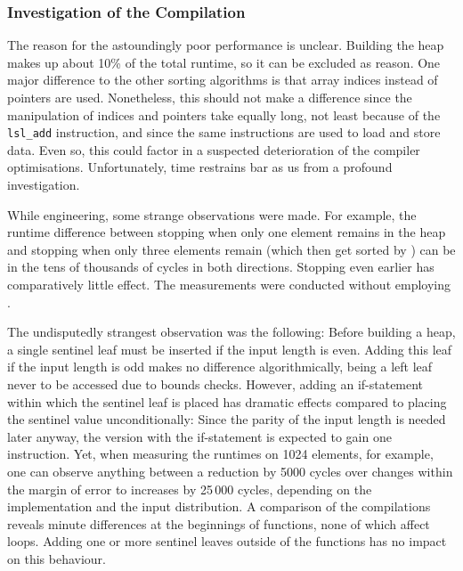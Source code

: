 \subsubsection*{Investigation of the Compilation}
\label{subsubsec:tasklet:heap:compilation}

The reason for the astoundingly poor performance is unclear.
Building the heap makes up about 10\% of the total runtime, so it can be excluded as reason.
One major difference to the other sorting algorithms is that array indices instead of pointers are used.
Nonetheless, this should not make a difference since the manipulation of indices and pointers take equally long, not least because of the \lstinline|lsl_add| instruction, and since the same instructions are used to load and store data.
Even so, this could factor in a suspected deterioration of the compiler optimisations.
Unfortunately, time restrains bar as us from a profound investigation.

While engineering, some strange observations were made.
For example, the runtime difference between stopping \HS{} when only one element remains in the heap and stopping \HS{} when only three elements remain (which then get sorted by \IS{}) can be in the tens of thousands of cycles in both directions.
Stopping \HS{} even earlier has comparatively little effect.
The measurements were conducted without employing \IS{}.

The undisputedly strangest observation was the following:
Before building a heap, a single sentinel leaf must be inserted if the input length is even.
Adding this leaf if the input length is odd makes no difference algorithmically, being a left leaf never to be accessed due to bounds checks.
However, adding an if-statement within which the sentinel leaf is placed has dramatic effects compared to placing the sentinel value unconditionally:
Since the parity of the input length is needed later anyway, the version with the if-statement is expected to gain one instruction.
Yet, when measuring the runtimes on 1024 elements, for example, one can observe anything between a reduction by 5000 cycles over changes within the margin of error to increases by 25\,000 cycles, depending on the implementation and the input distribution.
A comparison of the compilations reveals minute differences at the beginnings of functions, none of which affect loops.
Adding one or more sentinel leaves outside of the functions has no impact on this behaviour.
